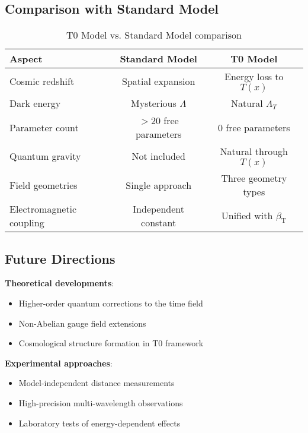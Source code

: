\documentclass[12pt,a4paper]{article}
\newcommand{\betaT}{\beta_{\text{T}}}
\begin{document}
	\subsection{Comparison with Standard Model}
	\label{subsec:standard_model_comparison}
	
	\begin{table}[htbp]
		\centering
		\begin{tabular}{|l|c|c|}
			\hline
			\textbf{Aspect} & \textbf{Standard Model} & \textbf{T0 Model} \\
			\hline
			Cosmic redshift & Spatial expansion & Energy loss to $T(x)$ \\
			Dark energy & Mysterious $\Lambda$ & Natural $\Lambda_T$ \\
			Parameter count & $>20$ free parameters & 0 free parameters \\
			Quantum gravity & Not included & Natural through $T(x)$ \\
			Field geometries & Single approach & Three geometry types \\
			Electromagnetic coupling & Independent constant & Unified with $\betaT$ \\
			\hline
		\end{tabular}
		\caption{T0 Model vs. Standard Model comparison}
	\end{table}
	
	\subsection{Future Directions}
	\label{subsec:future_directions}
	
	\textbf{Theoretical developments}:
	\begin{itemize}
		\item Higher-order quantum corrections to the time field
		\item Non-Abelian gauge field extensions
		\item Cosmological structure formation in T0 framework
	\end{itemize}
	
	\textbf{Experimental approaches}:
	\begin{itemize}
		\item Model-independent distance measurements
		\item High-precision multi-wavelength observations
		\item Laboratory tests of energy-dependent effects
	\end{itemize}
	
\end{document}
